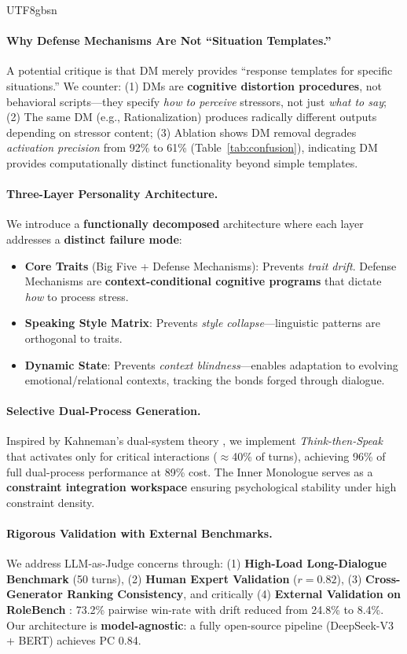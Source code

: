 \documentclass[11pt]{article}
\begin{document}
\begin{CJK*}{UTF8}{gbsn}
\paragraph{Why Defense Mechanisms Are Not ``Situation Templates.''} A potential critique is that DM merely provides ``response templates for specific situations.'' We counter: (1) DMs are \textbf{cognitive distortion procedures}, not behavioral scripts---they specify \textit{how to perceive} stressors, not just \textit{what to say}; (2) The same DM (e.g., Rationalization) produces radically different outputs depending on stressor content; (3) Ablation shows DM removal degrades \textit{activation precision} from 92\% to 61\% (Table~\ref{tab:confusion}), indicating DM provides computationally distinct functionality beyond simple templates.

\paragraph{Three-Layer Personality Architecture.} We introduce a \textbf{functionally decomposed} architecture where each layer addresses a \textbf{distinct failure mode}:
\begin{itemize}
    \item \textbf{Core Traits} (Big Five + Defense Mechanisms): Prevents \textit{trait drift}. Defense Mechanisms are \textbf{context-conditional cognitive programs} that dictate \textit{how} to process stress.
    \item \textbf{Speaking Style Matrix}: Prevents \textit{style collapse}---linguistic patterns are orthogonal to traits.
    \item \textbf{Dynamic State}: Prevents \textit{context blindness}---enables adaptation to evolving emotional/relational contexts, tracking the bonds forged through dialogue.
\end{itemize}

\paragraph{Selective Dual-Process Generation.} Inspired by Kahneman's dual-system theory \citep{kahneman2011thinking}, we implement \textit{Think-then-Speak} that activates only for critical interactions ($\approx$40\% of turns), achieving 96\% of full dual-process performance at 89\% cost. The Inner Monologue serves as a \textbf{constraint integration workspace} ensuring psychological stability under high constraint density.

\paragraph{Rigorous Validation with External Benchmarks.} We address LLM-as-Judge concerns through: (1) \textbf{High-Load Long-Dialogue Benchmark} (50 turns), (2) \textbf{Human Expert Validation} ($r = 0.82$), (3) \textbf{Cross-Generator Ranking Consistency}, and critically (4) \textbf{External Validation on RoleBench} \citep{wang2024rolellm}: 73.2\% pairwise win-rate with drift reduced from 24.8\% to 8.4\%. Our architecture is \textbf{model-agnostic}: a fully open-source pipeline (DeepSeek-V3 + BERT) achieves PC 0.84.



\end{CJK*}
\end{document}
